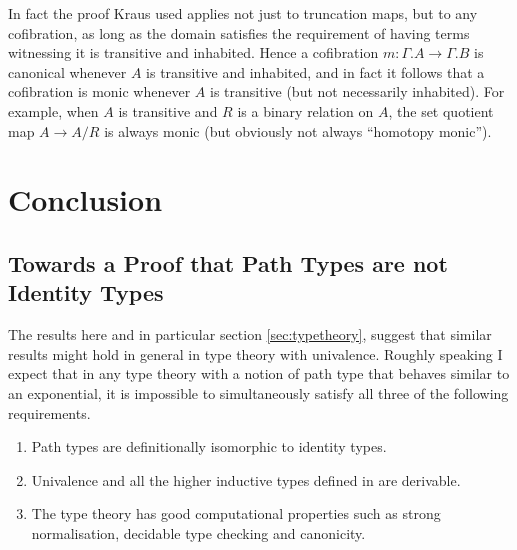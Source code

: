\documentclass[a4paper]{amsart}
\newtheorem{conjecture}[theorem]{Conjecture}
\theoremstyle{definition}
\begin{document}
In fact the proof Kraus used applies not just to truncation maps, but
to any cofibration, as long as the domain satisfies the requirement of
having terms witnessing it is transitive and inhabited. Hence a
cofibration $m \colon \Gamma.A \to \Gamma.B$ is canonical whenever $A$
is transitive and inhabited, and in fact it follows that a cofibration
is monic whenever $A$ is transitive (but not necessarily
inhabited). For example, when $A$ is transitive and $R$ is a binary
relation on $A$, the set quotient map $A \to A/R$ is always monic (but
obviously not always ``homotopy monic'').



\section{Conclusion}
\label{sec:conclusion}

\subsection{Towards a Proof that Path Types are not Identity Types}

The results here and in particular section \ref{sec:typetheory},
suggest that similar results might hold in general in type theory
with univalence. Roughly speaking I expect that in any type theory
with a notion of path type that behaves similar to an exponential, it is
impossible to simultaneously satisfy all three of the following
requirements.
\begin{enumerate}
\item \label{condspathid}Path types are definitionally isomorphic to
  identity types.
\item \label{condshott}Univalence and all the higher inductive
  types defined in \cite{hottbook} are derivable.
\item \label{condscomputes}The type theory has good computational
  properties such as strong normalisation, decidable type checking and
  canonicity.
\end{enumerate}
\end{document}

